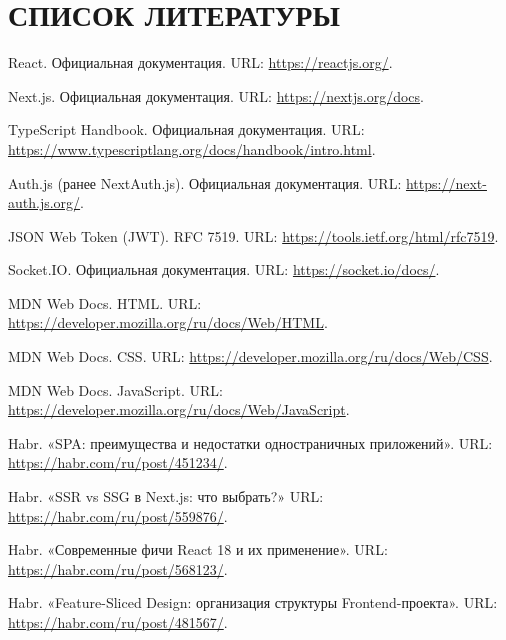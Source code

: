 \section*{СПИСОК ЛИТЕРАТУРЫ}
\vspace{-1.5\baselineskip}

\begingroup
  \let\clearpage\relax
  \let\newpage\relax
  \let\addcontentsline\relax
  \renewcommand{\refname}{}

  \begin{thebibliography}{99}

    React. Официальная документация. URL: \url{https://reactjs.org/}.

    Next.js. Официальная документация. URL: \url{https://nextjs.org/docs}.

    TypeScript Handbook. Официальная документация. URL: \url{https://www.typescriptlang.org/docs/handbook/intro.html}.

    Auth.js (ранее NextAuth.js). Официальная документация. URL: \url{https://next-auth.js.org/}.

    JSON Web Token (JWT). RFC 7519. URL: \url{https://tools.ietf.org/html/rfc7519}.

    Socket.IO. Официальная документация. URL: \url{https://socket.io/docs/}.

    MDN Web Docs. HTML. URL: \url{https://developer.mozilla.org/ru/docs/Web/HTML}.

    MDN Web Docs. CSS. URL: \url{https://developer.mozilla.org/ru/docs/Web/CSS}.

    MDN Web Docs. JavaScript. URL: \url{https://developer.mozilla.org/ru/docs/Web/JavaScript}.

    Habr. «SPA: преимущества и недостатки одностраничных приложений». URL: \url{https://habr.com/ru/post/451234/}.

    Habr. «SSR vs SSG в Next.js: что выбрать?» URL: \url{https://habr.com/ru/post/559876/}.

    Habr. «Современные фичи React 18 и их применение». URL: \url{https://habr.com/ru/post/568123/}.

    Habr. «Feature-Sliced Design: организация структуры Frontend-проекта». URL: \url{https://habr.com/ru/post/481567/}.


\end{thebibliography}
